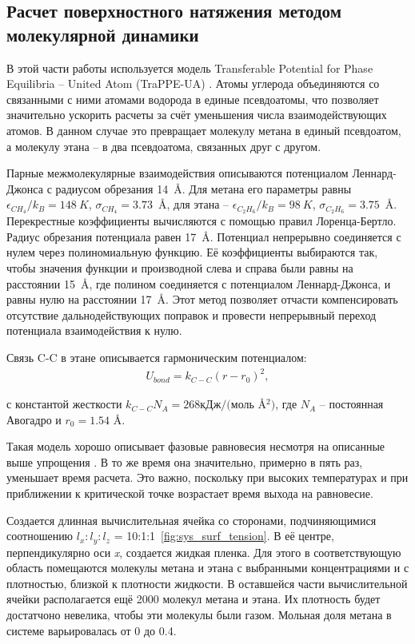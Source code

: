 \subsection{Расчет поверхностного натяжения методом молекулярной динамики}\label{subsec:ch3/sect2/sub1}

В этой части работы используется модель Transferable Potential for Phase Equilibria -- United Atom (TraPPE-UA) \cite{trappeua}. Атомы углерода объединяются со связанными с ними атомами водорода в единые псевдоатомы, что позволяет значительно ускорить расчеты за счёт уменьшения числа взаимодействующих атомов. В данном случае это превращает молекулу метана в единый псевдоатом, а молекулу этана \--- в два псевдоатома, связанных  друг с другом.

Парные межмолекулярные взаимодействия описываются потенциалом Леннард-Джонса с радиусом обрезания 14~\AA . Для метана его параметры равны $\epsilon_{CH_4} / k_B = 148~K$, $\sigma_{CH_4} = 3.73$~\AA, для этана \--- $\epsilon_{C_2 H_6} / k_B = 98~K$, $\sigma_{C_2 H_6} = 3.75$~\AA. Перекрестные коэффициенты вычисляются с помощью правил Лоренца-Бертло. Радиус обрезания потенциала равен 17~\AA. Потенциал непрерывно соединяется с нулем через полиномиальную функцию. Её коэффициенты выбираются так, чтобы значения функции и производной слева и справа были равны на расстоянии 15~\AA, где полином соединяется с потенциалом Леннард-Джонса, и равны нулю на расстоянии 17~\AA. Этот метод позволяет отчасти компенсировать отсутствие дальнодействующих поправок и провести непрерывный переход потенциала взаимодействия к нулю.

Связь C-C в этане описывается гармоническим потенциалом:
\begin{align}
	U_{bond} = k_{C-C} (r-r_0)^2 ,
\end{align}

 с константой жесткости $k_{C-C}N_A = 268 кДж/($моль \AA $^2) $, где $N_A$ \--- постоянная Авогадро и $r_0 = 1.54$ \AA.

Такая модель хорошо описывает фазовые равновесия несмотря на описанные выше упрощения \cite{trappeua}. В то же время она значительно, примерно в пять раз, уменьшает время расчета. Это важно, поскольку при высоких температурах и при приближении к критической точке возрастает время выхода на равновесие. 

Создается длинная вычислительная ячейка со сторонами, подчиняющимися соотношению $l_x:l_y:l_z$ = 10:1:1~\cref{fig:sys_surf_tension}. В её центре, перпендикулярно оси \textit{x}, создается жидкая пленка. Для этого в соответствующую область помещаются молекулы метана и этана с выбранными концентрациями и с плотностью, близкой к плотности жидкости. В оставшейся части вычислительной ячейки располагается ещё 2000 молекул метана и этана. Их плотность будет достатчоно невелика, чтобы эти молекулы были газом. Мольная доля метана в системе варьировалась от 0 до 0.4. 

